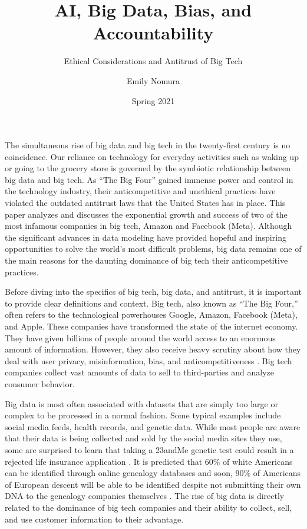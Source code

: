 \documentclass[twoside]{article}
\title{AI, Big Data, Bias, and Accountability}
\subtitle{Ethical Considerations and Antitrust of Big Tech} %
\author{Emily Nomura}
\date{Spring 2021}
\begin{document}
\maketitle{}

The simultaneous rise of big data and big tech in the twenty-first century is no coincidence. Our reliance on technology for everyday activities such as waking up or going to the grocery store is governed by the symbiotic relationship between big data and big tech. As “The Big Four” gained immense power and control in the technology industry, their anticompetitive and unethical practices have violated the outdated antitrust laws that the United States has in place. This paper analyzes and discusses the exponential growth and success of two of the most infamous companies in big tech, Amazon and Facebook (Meta). Although the significant advances in data modeling have provided hopeful and inspiring opportunities to solve the world’s most difficult problems, big data remains one of the main reasons for the daunting dominance of big tech their anticompetitive practices. 

Before diving into the specifics of big tech, big data, and antitrust, it is important to provide clear definitions and context. Big tech, also known as “The Big Four,” often refers to the technological powerhouses Google, Amazon, Facebook (Meta), and Apple. These companies have transformed the state of the internet economy. They have given billions of people around the world access to an enormous amount of information. However, they also receive heavy scrutiny about how they deal with user privacy, misinformation, bias, and anticompetitiveness \cite{antitrust}. Big tech companies  collect vast amounts of data to sell to third-parties and analyze consumer behavior.

Big data is most often associated with datasets that are simply too large or complex to be processed in a normal fashion. Some typical examples include social media feeds, health records, and genetic data. While most people are aware that their data is being collected and  sold by the social media sites they use, some are surprised to learn that taking a 23andMe genetic test could result in a rejected life insurance application \cite{genetic}. It is predicted that 60\% of white Americans can be identified through online genealogy databases and soon, 90\% of Americans of European descent will be able to be identified despite not submitting their own DNA to the genealogy companies themselves \cite{napkin}. The rise of big data is directly related to the dominance of big tech companies and their ability to collect, sell, and use customer information to their advantage.
\end{document}

